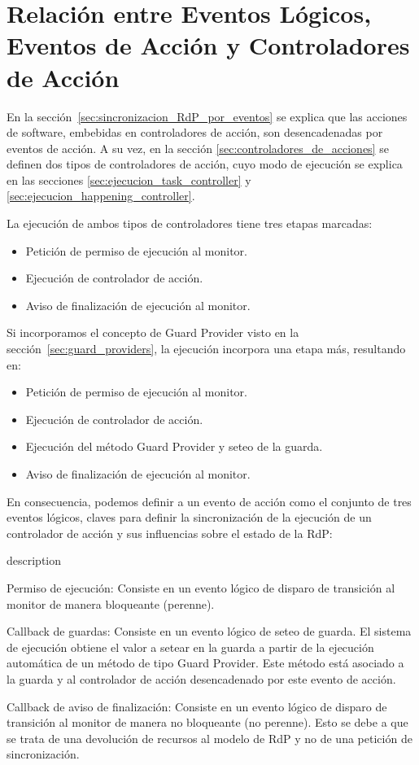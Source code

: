 \section{Relación entre Eventos Lógicos, Eventos de Acción y Controladores de
Acción}
En la sección~\ref{sec:sincronizacion_RdP_por_eventos} se explica que las
acciones de software, embebidas en controladores de acción, son desencadenadas
por eventos de acción. A su vez, en la sección
\ref{sec:controladores_de_acciones} se definen dos tipos de controladores de
acción, cuyo modo de ejecución se explica en las secciones
\ref{sec:ejecucion_task_controller} y \ref{sec:ejecucion_happening_controller}.

La ejecución de ambos tipos de controladores tiene tres etapas marcadas:
\begin{itemize}
  \item Petición de permiso de ejecución al monitor.
  \item Ejecución de controlador de acción.
  \item Aviso de finalización de ejecución al monitor.
\end{itemize}

Si incorporamos el concepto de Guard Provider visto en la
sección~\ref{sec:guard_providers}, la ejecución incorpora una etapa más,
resultando en:
\begin{itemize}
  \item Petición de permiso de ejecución al monitor.
  \item Ejecución de controlador de acción.
  \item Ejecución del método Guard Provider y seteo de la guarda.
  \item Aviso de finalización de ejecución al monitor.
\end{itemize}

En consecuencia, podemos definir a un evento de acción como el conjunto de tres
eventos lógicos, claves para definir la sincronización de la ejecución de un
controlador de acción y sus influencias sobre el estado de la RdP:
\begin{labeling}{description}
  \item [Permiso de ejecución: ] Consiste en un evento lógico de disparo
  de transición al monitor de manera bloqueante (perenne).
  \item [Callback de guardas: ] Consiste en un evento lógico de seteo de
  guarda. El sistema de ejecución obtiene el valor a setear en la guarda a
  partir de la ejecución automática de un método de tipo Guard Provider. Este
  método está asociado a la guarda y al controlador de acción desencadenado por
  este evento de acción.
  \item [Callback de aviso de finalización: ]
  Consiste en un evento lógico de disparo de transición al monitor de manera no
  bloqueante (no perenne). Esto se debe a que se trata de una devolución de
  recursos al modelo de RdP y no de una petición de sincronización.
\end{labeling}

